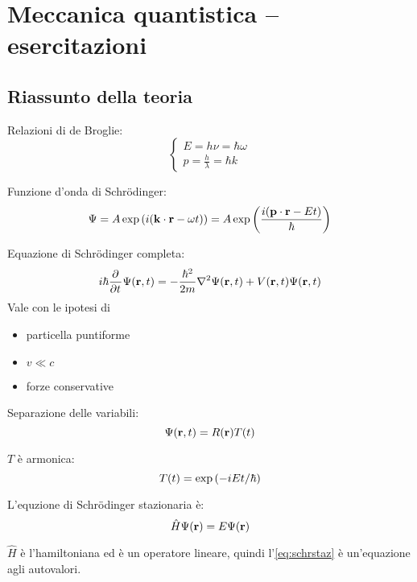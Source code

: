 \chapter{Meccanica quantistica -- esercitazioni}

\section{Riassunto della teoria}

Relazioni di de Broglie:
\begin{equation}
    \begin{cases}
        E = h \nu = \hbar \omega \\
        p = \frac{h}{\lambda} = \hbar k
    \end{cases}
\end{equation}

Funzione d'onda di Schrödinger:
\begin{equation}
    \Psi = A \operatorname{exp}\left( i (\mathbf{k} \cdot \mathbf{r} - \omega t) \right)
    = A \operatorname{exp}\left( \frac{i (\mathbf{p} \cdot \mathbf{r} - Et)}{\hbar} \right)
\end{equation}

Equazione di Schrödinger completa:
\begin{equation}
    \im \hbar \parder{t} \Psi(\p, t) = - \frac{\hbar^2}{2 m} \lapl \Psi(\p, t) + V(\p, t) \Psi(\p, t)
\end{equation}
Vale con le ipotesi di
\begin{itemize}
    \item particella puntiforme
    \item $v \ll c$
    \item forze conservative
\end{itemize}

Separazione delle variabili:
\begin{equation}
    \Psi(\mathbf{r}, t) = R(\mathbf{r}) T(t)
\end{equation}

$T$ è armonica:
\begin{equation}
    T(t) = \operatorname{exp}\left( -i E t/\hbar \right)
\end{equation}

L'equzione di Schrödinger stazionaria è:
\begin{equation}
\label{eq:schrstaz}
    \hat{H} \Psi(\mathbf{r}) = E \Psi(\mathbf{r})
\end{equation}

$\hat{H}$ è l'hamiltoniana ed è un operatore lineare, quindi l'\cref{eq:schrstaz} è un'equazione agli autovalori.

